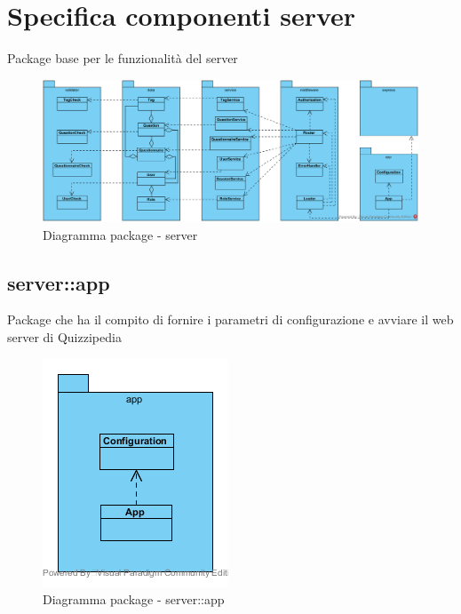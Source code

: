 \section{Specifica componenti server}
Package base per le funzionalità del server\begin{center}
	\begin{figure}[H]
		\centering \includegraphics[scale=4, max width=\textwidth, max height=\myheight]{../img/diagrammiClassi/server.png}
		\caption{Diagramma package - server}
	\end{figure}
\end{center}\subsection{server::app}
Package che ha il compito di fornire i parametri di configurazione e avviare il web server di Quizzipedia\begin{center}
	\begin{figure}[H]
		\centering \includegraphics[scale=4, max width=\textwidth, max height=\myheight]{../img/diagrammiClassi/server/app.png}
		\caption{Diagramma package - server::app}
	\end{figure}
\end{center}\hypertarget{server::app::App}{}
